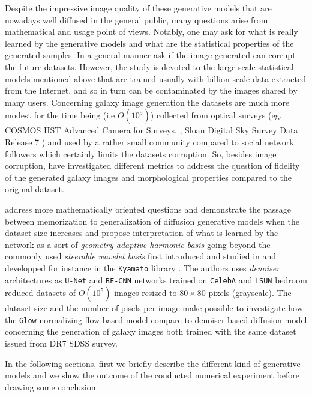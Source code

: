 \documentclass[11pt]{amsart}
\begin{document}
Despite the impressive image quality of these generative models that are nowadays well diffused in the general public, many questions arise from mathematical and usage point of views. Notably, one may ask for what is really learned by the generative models and what are the statistical properties of the generated samples. In a general manner \cite{Hataya2023} ask if the image generated can corrupt the future datasets. However, the study is devoted  to the large scale statistical models mentioned above that are trained usually with billion-scale data extracted from the Internet, and so in turn can be contaminated by the images shared by many users. Concerning galaxy image generation the datasets are much more modest for the time being (i.e $O(10^5)$) collected from optical surveys (eg. COSMOS HST Advanced Camera for Surveys, \cite{mandelbaum_2019_3242143},  Sloan Digital Sky Survey \citep[SDSS;][]{sdss} Data Release 7 \citep{sdssdr7}) and used by a rather small community compared to social network followers which certainly  limits the datasets corruption. So, besides image corruption, \cite{HACKSTEIN2023100685,janulewicz2024assessing} have investigated different metrics to address the question of fidelity of the generated galaxy images and morphological properties compared to the original dataset.

\cite{kadkhodaie2024generalization} address more mathematically oriented questions and demonstrate the passage between memorization to generalization of  diffusion generative models when the dataset size increases and propose interpretation of what is learned by the network as a sort of \textit{geometry-adaptive harmonic basis} going beyond the commonly used \textit{steerable wavelet basis} first introduced and studied in \cite{Simoncelli1995b,Unser2013} and developped for instance in the \texttt{Kyamato} library \citep{JMLR:v21:19-047}. The authors uses \textit{denoiser} architectures as \texttt{U-Net} \citep{2015arXiv150504597R} and \texttt{BF-CNN} networks \citep{Mohan2020Robust} trained on \texttt{CelebA} \citep{Liu2015} and \texttt{LSUN} bedroom  \citep{Yu2015} reduced datasets of $O(10^5)$ images resized to $80\times 80$ pixels (grayscale). The dataset size and the number of pisels per image make possible to investigate how the \texttt{Glow} normalizing flow based model compare to denoiser based diffusion model concerning the generation of galaxy images both trained with the same dataset issued from DR7 SDSS survey.


In the following sections, first we briefly describe the different kind of generative models and we show the outcome of the conducted numerical experiment before drawing some conclusion.
%
\end{document}
